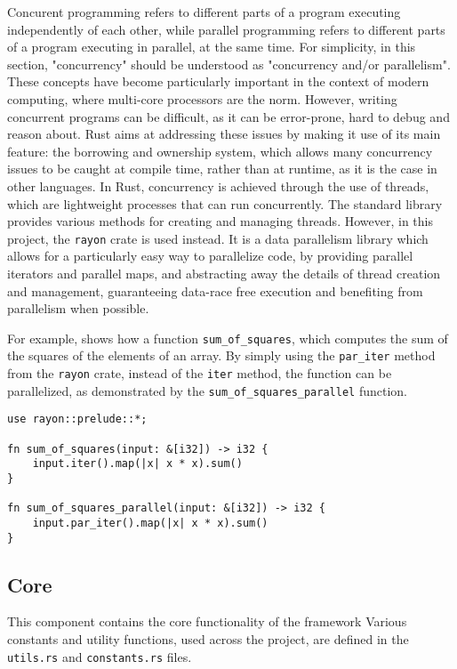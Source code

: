 Concurent programming refers to different parts of a program executing independently of each other, while parallel programming refers to different parts
of a program executing in parallel, at the same time. For simplicity, in this section, "concurrency" should be understood as "concurrency and/or parallelism".
These concepts have become particularly important in the context of modern computing, where multi-core processors are the norm. However, writing concurrent
programs can be difficult, as it can be error-prone, hard to debug and reason about. Rust aims at addressing these issues by making it use of its main feature:
the borrowing and ownership system, which allows many concurrency issues to be caught at compile time, rather than at runtime, as it is the case in other languages.
In Rust, concurrency is achieved through the use of threads, which are lightweight processes that can run concurrently. The standard library provides
various methods for creating and managing threads. However, in this project, the \texttt{rayon} crate is used instead. It is a data parallelism library
which allows for a particularly easy way to parallelize code, by providing parallel iterators and parallel maps, and abstracting away the details of
thread creation and management, guaranteeing data-race free execution and benefiting from parallelism when possible.

For example,  shows how a function \texttt{sum\_of\_squares}, which computes the sum of the squares of the elements of an array.
By simply using the \texttt{par\_iter} method from the \texttt{rayon} crate, instead of the \texttt{iter} method, the function can be parallelized, as demonstrated
by the \texttt{sum\_of\_squares\_parallel} function.

\begin{lstlisting}[label=lst:sum_of_squares,caption=Sum of squares,float,frame=tb]
use rayon::prelude::*;

fn sum_of_squares(input: &[i32]) -> i32 {
    input.iter().map(|x| x * x).sum()
}

fn sum_of_squares_parallel(input: &[i32]) -> i32 {
    input.par_iter().map(|x| x * x).sum()
}
\end{lstlisting}


\subsection{Core}

This component contains the core functionality of the framework
Various constants and utility functions, used across the project, are defined in the \texttt{utils.rs} and \texttt{constants.rs} files.

